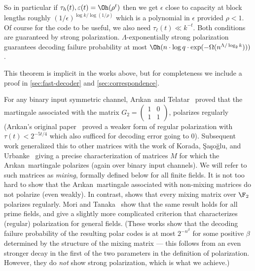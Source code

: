 \documentclass[11pt]{article}
\newcommand{\Arikan}{Ar\i kan}
\begin{document}
\begin{remark}
	\label{rem:using-channel-coding-result}
	So in particular if $\tau_h(t),\varepsilon(t) = \Oh(\rho^t)$ then we get $\epsilon$ close to capacity at block lengths roughly
	$(1/\epsilon)^{\log k/\log(1/\rho)}$ which is a polynomial in $\epsilon$ provided $\rho < 1$. 
	Of course for the code to be useful, we also need $\tau_\ell(t) \ll k^{-t}$. Both conditions are guaranteed by strong polarization.
	$\Lambda$-exponentially strong polarization guarantees decoding failure probability at most $\Oh(n \cdot\log q \cdot \exp(-\Omega(n^{\Lambda/\log_2 k})))$. 
\end{remark}

This theorem is implicit in the works above, but for completeness we include a proof in \cref{sec:fast-decoder} and \cref{sec:correspondence}.


For any binary input symmetric channel, 
\Arikan\ and Telatar~\cite{arikan-telatar} proved that the martingale associated with the matrix $G_2 = \left( \begin{smallmatrix}
	1 & 0  \\
	1 & 1
\end{smallmatrix} \right)$, polarizes regularly (\Arikan's original paper~\cite{arikan-polar} proved a weaker form of regular polarization with $\tau(t) < 2^{-5t/4}$ which also sufficed for decoding error going to $0$). Subsequent work generalized this to other matrices with the work of Korada, \c{S}a\c{s}o\u{g}lu, and Urbanke~\cite{KSU10} giving a precise characterization of matrices $M$ for which the \Arikan\ martingale polarizes (again over binary input channels). We will refer to such matrices as \emph{mixing}, formally defined below for all finite fields.
It is not too hard to show that the \Arikan\ martingale associated with non-mixing matrices do not polarize (even weakly). In contrast, \cite{KSU10} shows that every mixing matrix over $\F_2$ polarizes regularly. Mori and Tanaka~\cite{mori-tanaka} show that the same result holds for all prime fields, and give a slightly more complicated criterion that characterizes (regular) polarization for general fields. (These works show that the decoding failure probability of the resulting polar codes is at most $2^{-n^\beta}$ for some positive $\beta$ determined by the structure of the mixing matrix --- this follows from an even stronger decay in the first of the two parameters in the definition of polarization. However, they do \emph{not} show strong polarization, which is what we achieve.)
\end{document}
